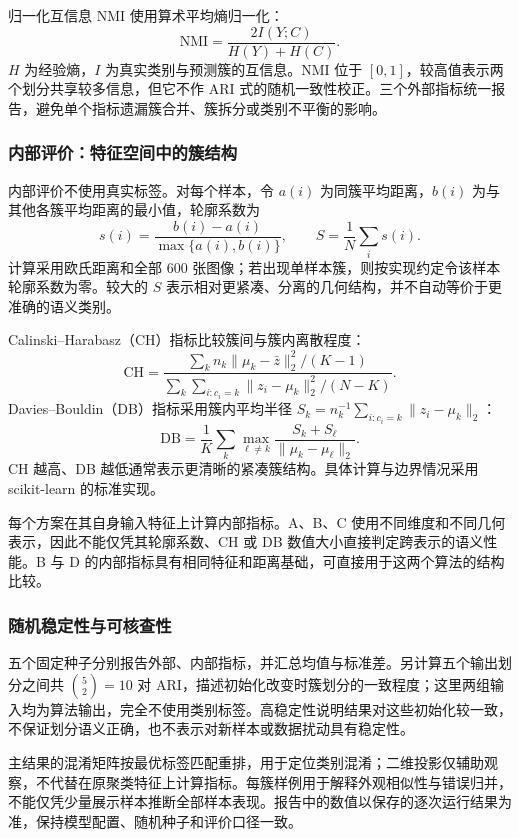 归一化互信息 NMI 使用算术平均熵归一化：
\begin{equation}
\mathrm{NMI}=\frac{2I(Y;C)}{H(Y)+H(C)}.
\end{equation}
$H$ 为经验熵，$I$ 为真实类别与预测簇的互信息。NMI 位于 $[0,1]$，较高值表示两个划分共享较多信息，但它不作 ARI 式的随机一致性校正。三个外部指标统一报告，避免单个指标遗漏簇合并、簇拆分或类别不平衡的影响。

\subsubsection{内部评价：特征空间中的簇结构}
内部评价不使用真实标签。对每个样本，令 $a(i)$ 为同簇平均距离，$b(i)$ 为与其他各簇平均距离的最小值，轮廓系数为
\begin{equation}
s(i)=\frac{b(i)-a(i)}{\max\{a(i),b(i)\}},\qquad
S=\frac{1}{N}\sum_i s(i).
\end{equation}
计算采用欧氏距离和全部 600 张图像；若出现单样本簇，则按实现约定令该样本轮廓系数为零。较大的 $S$ 表示相对更紧凑、分离的几何结构，并不自动等价于更准确的语义类别。

Calinski--Harabasz（CH）指标比较簇间与簇内离散程度：
\begin{equation}
\mathrm{CH}=\frac{\sum_k n_k\|\mu_k-\bar z\|_2^2/(K-1)}
{\sum_k\sum_{i:c_i=k}\|z_i-\mu_k\|_2^2/(N-K)}.
\end{equation}
Davies--Bouldin（DB）指标采用簇内平均半径
$S_k=n_k^{-1}\sum_{i:c_i=k}\|z_i-\mu_k\|_2$：
\begin{equation}
\mathrm{DB}=\frac{1}{K}\sum_k\max_{\ell\ne k}
\frac{S_k+S_\ell}{\|\mu_k-\mu_\ell\|_2}.
\end{equation}
CH 越高、DB 越低通常表示更清晰的紧凑簇结构。具体计算与边界情况采用 scikit-learn 的标准实现\citep{sklearnclustering}。

每个方案在其自身输入特征上计算内部指标。A、B、C 使用不同维度和不同几何表示，因此不能仅凭其轮廓系数、CH 或 DB 数值大小直接判定跨表示的语义性能。B 与 D 的内部指标具有相同特征和距离基础，可直接用于这两个算法的结构比较。

\subsubsection{随机稳定性与可核查性}
五个固定种子分别报告外部、内部指标，并汇总均值与标准差。另计算五个输出划分之间共 $\binom52=10$ 对 ARI，描述初始化改变时簇划分的一致程度；这里两组输入均为算法输出，完全不使用类别标签。高稳定性说明结果对这些初始化较一致，不保证划分语义正确，也不表示对新样本或数据扰动具有稳定性。

主结果的混淆矩阵按最优标签匹配重排，用于定位类别混淆；二维投影仅辅助观察，不代替在原聚类特征上计算指标。每簇样例用于解释外观相似性与错误归并，不能仅凭少量展示样本推断全部样本表现。报告中的数值以保存的逐次运行结果为准，保持模型配置、随机种子和评价口径一致。
